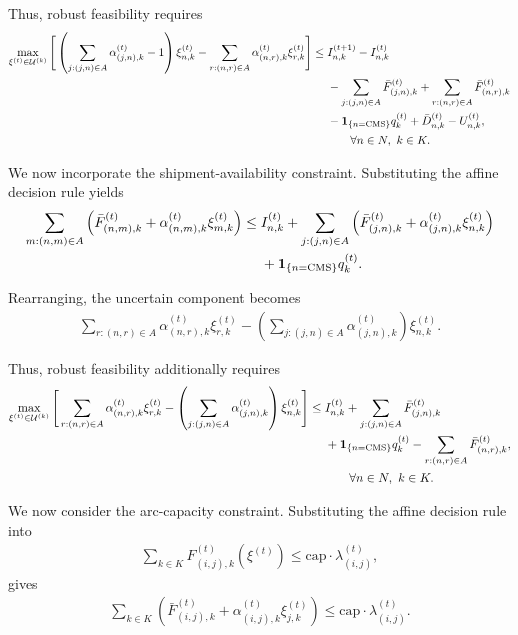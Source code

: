 \documentclass{article}
\begin{document}
Thus, robust feasibility requires
\begin{align}
\max_{\xi^{(t)} \in \mathcal U^{(k)}}
\Bigg[
\left(
\sum_{j:(j,n)\in A} \alpha_{(j,n),k}^{(t)} - 1
\right)\xi_{n,k}^{(t)}
-
\sum_{r:(n,r)\in A} \alpha_{(n,r),k}^{(t)} \xi_{r,k}^{(t)}
\Bigg]
\le\;&
I_{n,k}^{(t+1)}
-
I_{n,k}^{(t)}
\notag\\
&-
\sum_{j:(j,n)\in A} \bar F_{(j,n),k}^{(t)}
+
\sum_{r:(n,r)\in A} \bar F_{(n,r),k}^{(t)}
\notag\\
&-
\mathbf{1}_{\{n=\mathrm{CMS}\}} q_k^{(t)}
+
\bar D_{n,k}^{(t)}
-
U_{n,k}^{(t)},
\notag\\
&\qquad \forall n \in N,\ k \in K.
\end{align}

\medskip

We now incorporate the shipment-availability constraint. Substituting
the affine decision rule yields
\begin{align}
\sum_{m:(n,m)\in A}
\left(
\bar F_{(n,m),k}^{(t)} + \alpha_{(n,m),k}^{(t)} \xi_{m,k}^{(t)}
\right)
\le\;&
I_{n,k}^{(t)}
+
\sum_{j:(j,n)\in A}
\left(
\bar F_{(j,n),k}^{(t)} + \alpha_{(j,n),k}^{(t)} \xi_{n,k}^{(t)}
\right)
\notag\\
&+
\mathbf{1}_{\{n=\mathrm{CMS}\}} q_k^{(t)}.
\end{align}

Rearranging, the uncertain component becomes
\begin{align}
\sum_{r:(n,r)\in A} \alpha_{(n,r),k}^{(t)} \xi_{r,k}^{(t)}
-
\left(
\sum_{j:(j,n)\in A} \alpha_{(j,n),k}^{(t)}
\right)\xi_{n,k}^{(t)}.
\end{align}

Thus, robust feasibility additionally requires
\begin{align}
\max_{\xi^{(t)} \in \mathcal U^{(k)}}
\Bigg[
\sum_{r:(n,r)\in A} \alpha_{(n,r),k}^{(t)} \xi_{r,k}^{(t)}
-
\left(
\sum_{j:(j,n)\in A} \alpha_{(j,n),k}^{(t)}
\right)\xi_{n,k}^{(t)}
\Bigg]
\le\;&
I_{n,k}^{(t)}
+
\sum_{j:(j,n)\in A} \bar F_{(j,n),k}^{(t)}
\notag\\
&+
\mathbf{1}_{\{n=\mathrm{CMS}\}} q_k^{(t)}
-
\sum_{r:(n,r)\in A} \bar F_{(n,r),k}^{(t)},
\notag\\
&\qquad \forall n \in N,\ k \in K.
\end{align}

\medskip

We now consider the arc-capacity constraint. Substituting the affine
decision rule into
\begin{align}
\sum_{k\in K} F_{(i,j),k}^{(t)}(\xi^{(t)})
\le
\mathrm{cap}\cdot \lambda_{(i,j)}^{(t)},
\end{align}
gives
\begin{align}
\sum_{k\in K}
\left(
\bar F_{(i,j),k}^{(t)}
+
\alpha_{(i,j),k}^{(t)} \xi_{j,k}^{(t)}
\right)
\le
\mathrm{cap}\cdot \lambda_{(i,j)}^{(t)}.
\end{align}
\end{document}
